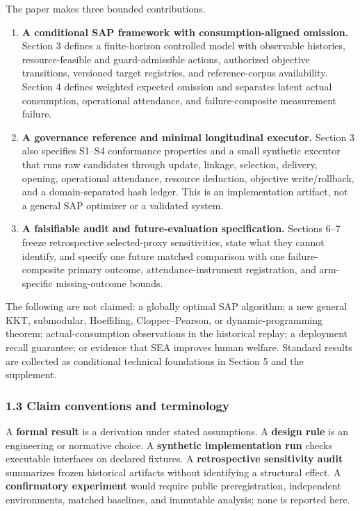 \documentclass[
  11pt]{article}
\providecommand{\tightlist}{%
  \setlength{\itemsep}{0pt}\setlength{\parskip}{0pt}}
\begin{document}
The paper makes three bounded contributions.

\begin{enumerate}
\def\labelenumi{\arabic{enumi}.}
\tightlist
\item
  \textbf{A conditional SAP framework with consumption-aligned
  omission.} Section 3 defines a finite-horizon controlled model with
  observable histories, resource-feasible and guard-admissible actions,
  authorized objective transitions, versioned target registries, and
  reference-corpus availability. Section 4 defines weighted expected
  omission and separates latent actual consumption, operational
  attendance, and failure-composite measurement failure.
\item
  \textbf{A governance reference and minimal longitudinal executor.}
  Section 3 also specifies S1--S4 conformance properties and a small
  synthetic executor that runs raw candidates through update, linkage,
  selection, delivery, opening, operational attendance, resource
  deduction, objective write/rollback, and a domain-separated hash
  ledger. This is an implementation artifact, not a general SAP
  optimizer or a validated system.
\item
  \textbf{A falsifiable audit and future-evaluation specification.}
  Sections 6--7 freeze retrospective selected-proxy sensitivities, state
  what they cannot identify, and specify one future matched comparison
  with one failure-composite primary outcome, attendance-instrument
  registration, and arm-specific missing-outcome bounds.
\end{enumerate}

The following are not claimed: a globally optimal SAP algorithm; a new
general KKT, submodular, Hoeffding, Clopper--Pearson, or
dynamic-programming theorem; actual-consumption observations in the
historical replay; a deployment recall guarantee; or evidence that SEA
improves human welfare. Standard results are collected as conditional
technical foundations in Section 5 and the supplement.

\subsubsection{1.3 Claim conventions and
terminology}\label{claim-conventions-and-terminology}

A \textbf{formal result} is a derivation under stated assumptions. A
\textbf{design rule} is an engineering or normative choice. A
\textbf{synthetic implementation run} checks executable interfaces on
declared fixtures. A \textbf{retrospective sensitivity audit} summarizes
frozen historical artifacts without identifying a structural effect. A
\textbf{confirmatory experiment} would require public preregistration,
independent environments, matched baselines, and immutable analysis;
none is reported here.
\end{document}
